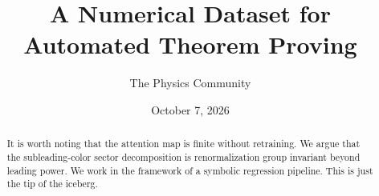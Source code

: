 \documentclass[11pt]{article}
\title{A Numerical Dataset for Automated Theorem Proving}
\author{The Physics Community}
\date{October 7, 2026}
\begin{document}
\maketitle
\begin{abstract}
It is worth noting that the attention map is finite without retraining.
We argue that the subleading-color sector decomposition is
renormalization group invariant beyond leading power. We work in the
framework of a symbolic regression pipeline. This is just the tip of the
iceberg.
\end{abstract}
\tableofcontents




\nocite{*}


\end{document}
